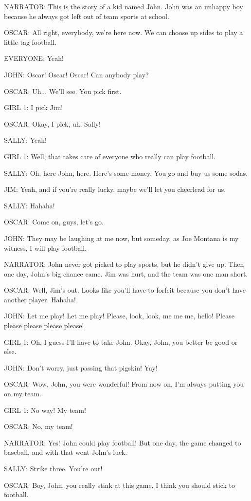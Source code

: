 NARRATOR:
This is the story of a kid named John.
John was an unhappy boy because he always got left out of team sports at school.

OSCAR:
All right, everybody, we're here now.
We can choose up sides to play a little tag football.

EVERYONE:
Yeah!

JOHN:
Oscar!
Oscar!
Oscar!
Can anybody play?

OSCAR:
Uh...
We'll see.
You pick first.

GIRL 1:
I pick Jim!

OSCAR:
Okay, I pick, uh, Sally!

SALLY:
Yeah!

GIRL 1:
Well, that takes care of everyone who really can play football.

SALLY:
Oh, here John, here.
Here's some money.
You go and buy us some sodas.

JIM:
Yeah, and if you're really lucky, maybe we'll let you cheerlead for us.

SALLY:
Hahaha!

OSCAR:
Come on, guys, let's go.

JOHN:
They may be laughing at me now, but someday, as Joe Montana is my witness, I will play football.

NARRATOR:
John never got picked to play sports, but he didn't give up.
Then one day, John's big chance came.
Jim was hurt, and the team was one man short.

OSCAR:
Well, Jim's out.
Looks like you'll have to forfeit because you don't have another player.
Hahaha!

JOHN:
Let me play!
Let me play!
Please, look, look, me me me, hello!
Please please please please please!

GIRL 1:
Oh, I guess I'll have to take John.
Okay, John, you better be good or else.

JOHN:
Don't worry, just passing that pigskin!
Yay!

OSCAR:
Wow, John, you were wonderful!
From now on, I'm always putting you on my team.

GIRL 1:
No way!
My team!

OSCAR:
No, my team!

NARRATOR:
Yes!
John could play football!
But one day, the game changed to baseball, and with that went John's luck.

SALLY:
Strike three.
You're out!

OSCAR:
Boy, John, you really stink at this game.
I think you should stick to football.

